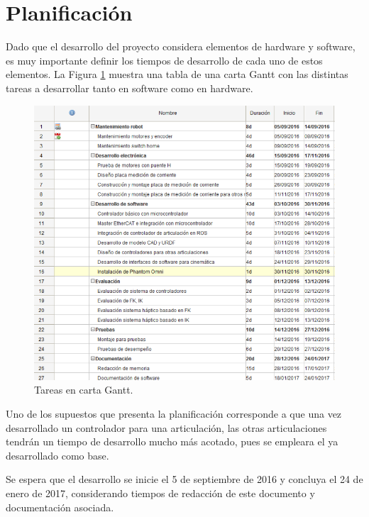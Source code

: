 \section{Planificación}

Dado que el desarrollo del proyecto considera elementos de hardware y software, es muy importante definir los tiempos de desarrollo de cada uno de estos elementos. La Figura \ref{cap1_tabla_gantt} muestra una tabla de una carta Gantt con las distintas tareas a desarrollar tanto en software como en hardware.

\begin{figure}[ht]
  \centering
  \includegraphics[scale=0.5]{img/cap1/tareas_gantt}
  \caption{Tareas en carta Gantt.}
  \label{cap1_tabla_gantt}
\end{figure}

Uno de los supuestos que presenta la planificación corresponde a que una vez desarrollado un controlador para una articulación, las otras articulaciones tendrán un tiempo de desarrollo mucho más acotado, pues se empleara el ya desarrollado como base.

Se espera que el desarrollo se inicie el 5 de septiembre de 2016 y concluya el 24 de enero de 2017, considerando tiempos de redacción de este documento y documentación asociada.








